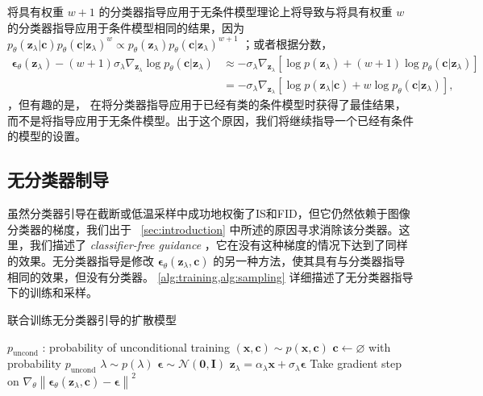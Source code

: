 \documentclass{article}
\newcommand{\grad}{\nabla}
\newcommand{\bI}{\mathbf{I}}
\newcommand{\bzero}{\mathbf{0}}
\newcommand{\bc}{\mathbf{c}}
\newcommand{\bx}{\mathbf{x}}
\newcommand{\bz}{\mathbf{z}}
\newcommand{\bepsilon}{{\boldsymbol{\epsilon}}}
\begin{document}
将具有权重 $w+1$ 的分类器指导应用于无条件模型理论上将导致与将具有权重 $w$ 的分类器指导应用于条件模型相同的结果，因为 $p_{\theta}(\bz_\lambda | \bc)p_{\theta}(\bc | \bz_\lambda)^{w} \propto p_{\theta}(\bz_\lambda)p_{\theta}(\bc | \bz_\lambda)^{w+1}$ ；或者根据分数，
 \begin{align*}
\bepsilon_\theta(\bz_\lambda) - (w+1)\sigma_{\lambda}\nabla_{\bz_\lambda}\log p_{\theta}(\bc | \bz_\lambda) &\approx -\sigma_{\lambda}\nabla_{\bz_\lambda}[\log p(\bz_\lambda) + (w+1) \log p_{\theta}(\bc | \bz_\lambda) ]  \\ 
&= -\sigma_{\lambda}\nabla_{\bz_\lambda}[\log p(\bz_\lambda|\bc) + w\log p_{\theta}(\bc | \bz_\lambda) ],
\end{align*} ，但有趣的是， \citeauthor{dhariwal2021diffusion} 在将分类器指导应用于已经有类的条件模型时获得了最佳结果，而不是将指导应用于无条件模型。出于这个原因，我们将继续指导一个已经有条件的模型的设置。


 \subsection{
无分类器制导} 


虽然分类器引导在截断或低温采样中成功地权衡了IS和FID，但它仍然依赖于图像分类器的梯度，我们出于~ \cref{sec:introduction} 中所述的原因寻求消除该分类器。这里，我们描述了 \emph{classifier-free guidance} ，它在没有这种梯度的情况下达到了同样的效果。无分类器指导是修改 $\bepsilon_\theta(\bz_\lambda, \bc)$ 的另一种方法，使其具有与分类器指导相同的效果，但没有分类器。 \cref{alg:training,alg:sampling} 详细描述了无分类器指导下的训练和采样。


 \begin{algorithm}[tb]
  \caption{
联合训练无分类器引导的扩散模型} \label{alg:training}
  \begin{algorithmic}[1]
    \Require     $p_\mathrm{uncond}$    : probability of unconditional training
    \Repeat
      \State     $(\bx,\bc) \sim p(\bx,\bc)$     
      \State     $\bc \gets \varnothing$     with probability     $p_\mathrm{uncond}$     
      \State     $\lambda \sim p(\lambda)$     
      \State     $\bepsilon\sim\mathcal{N}(\bzero,\bI)$    
      \State     $\bz_\lambda = \alpha_\lambda\bx + \sigma_\lambda \bepsilon$     
      \State Take gradient step on     $\grad_\theta \left\| \bepsilon_\theta(\bz_\lambda,\bc) - \bepsilon \right\|^2$     
  \end{algorithmic}
\end{algorithm} 
\end{document}
